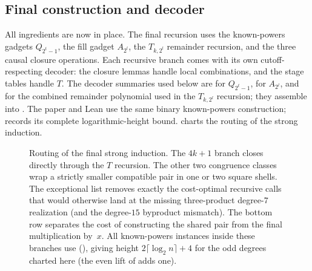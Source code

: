\subsection{Final construction and decoder}
\label{sec:final}

All ingredients are now in place.  The final recursion uses the known-powers
gadgets $Q_{2^t-1}$, the fill gadget $A_{2^l}$, the $T_{k,2^l}$ remainder
recursion, and the three causal closure operations.  Each recursive branch
comes with its own cutoff-respecting decoder: the closure lemmas handle local
combinations, and the stage tables handle $T$.  The decoder summaries used
below are
 for $Q_{2^t-1}$,
 for $A_{2^l}$,
and  for the combined remainder polynomial used in the $T_{k,2^l}$ recursion;
they assemble into .
The paper and Lean use the same binary known-powers construction;
 records its complete logarithmic-height bound.
 charts the routing of the strong induction.

\begin{figure}[H]
  \centering
  \resizebox{\textwidth}{!}{}
  \caption{Routing of the final strong induction.  The $4k+1$ branch closes
  directly through the $T$ recursion.  The other two congruence classes wrap
  a strictly smaller compatible pair in one or two square shells.  The
  exceptional list removes exactly the cost-optimal recursive calls that
  would otherwise land at the missing three-product degree-$7$ realization
  (and the degree-$15$ byproduct mismatch).
  The bottom row separates the cost of constructing the shared pair from the
  final multiplication by~$x$.  All known-powers instances inside these
  branches use 
  (), giving height
  $2\lceil\log_2 n\rceil+4$ for the odd degrees charted here (the even
  lift of  adds one).}
  \label{fig:final-recursion}
\end{figure}

